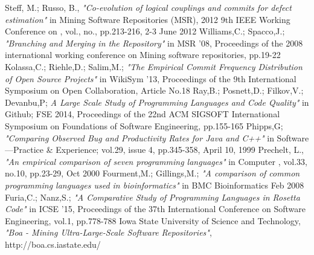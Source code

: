 \begin{thebibliography}{1}
\bibitem{}
Steff, M.; Russo, B., \emph{"Co-evolution of logical couplings and commits for defect estimation"} in Mining Software Repositories (MSR), 2012 9th IEEE Working Conference on , vol., no., pp.213-216, 2-3 June 2012
\bibitem{}
Williams,C.; Spacco,J.; \emph{"Branching and Merging in the Repository"} in MSR '08, Proceedings of the 2008 international working conference on Mining software repositories, pp.19-22
\bibitem{}
Kolassa,C.; Riehle,D.; Salim,M.; \emph{"The Empirical Commit Frequency Distribution of Open Source Projects"} in WikiSym '13, Proceedings of the 9th International Symposium on Open Collaboration, Article No.18
\bibitem{}
Ray,B.; Posnett,D.; Filkov,V.; Devanbu,P;  \emph{A Large Scale Study of Programming Languages and Code Quality"} in Github;  FSE 2014, Proceedings of the 22nd ACM SIGSOFT International Symposium on Foundations of Software Engineering, pp.155-165
\bibitem{}
Phipps,G; \emph{"Comparing Observed Bug and Productivity Rates for Java and C++" } in Software—Practice \& Experience; vol.29, issue 4, pp.345-358, April 10, 1999 
\bibitem{}
Prechelt, L., \emph{"An empirical comparison of seven programming languages"} in Computer , vol.33, no.10, pp.23-29, Oct 2000
\bibitem{}
Fourment,M.; Gillings,M.; \emph{"A comparison of common programming languages used in bioinformatics"} in BMC Bioinformatics Feb 2008
\bibitem{}
Furia,C.; Nanz,S.; \emph{"A Comparative Study of Programming Languages in Rosetta Code"} in ICSE '15, Proceedings of the 37th International Conference on Software Engineering, vol.1, pp.778-788
\bibitem{}
Iowa State University of Science and Technology,  \emph{"Boa - Mining Ultra-Large-Scale Software Repositories"}, http://boa.cs.iastate.edu/


\end{thebibliography}

% 










